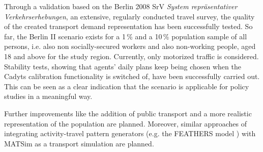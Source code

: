 Through a validation based on the Berlin 2008 SrV \textit{System repräsentativer Verkehrserhebungen}, an extensive, regularly conducted travel survey, the quality of the created transport demand representation has been successfully tested. So far, the Berlin II scenario exists for a 1\,\%{} and a 10\,\%{} population sample of all persons, i.e. also non socially-secured workers and also non-working people, aged 18 and above for the study region. Currently, only motorized traffic is considered. Stability tests, showing that agents' daily plans keep being chosen when the Cadyts calibration functionality is switched of, have been successfully carried out. This can be seen as a clear indication that the scenario is applicable for policy studies in a meaningful way.

Further improvements like the addition of public transport and a more realistic representation of the population are planned. Moreover, similar approaches of integrating activity-travel pattern generators (e.g. the FEATHERS model \citep[][]{ArentzeEtAl_TRBTDF_2006}) with MATSim as a transport simulation are planned.

%
%
%

